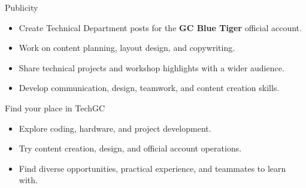 \begin{frame}{Publicity}
\begin{itemize}
    \item Create Technical Department posts for the \textbf{GC Blue Tiger} official account.
    \item Work on content planning, layout design, and copywriting.
    \item Share technical projects and workshop highlights with a wider audience.
    \item Develop communication, design, teamwork, and content creation skills.
\end{itemize}
\end{frame}

\begin{frame}{Find your place in TechGC}
\begin{itemize}
    \item Explore coding, hardware, and project development.
    \item Try content creation, design, and official account operations.
    \item Find diverse opportunities, practical experience, and teammates to learn with.
\end{itemize}
\end{frame}
